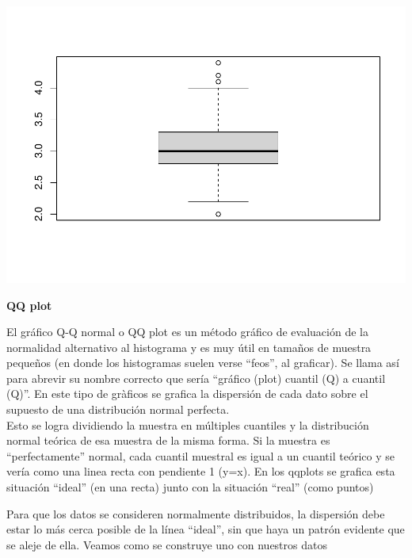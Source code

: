 \documentclass[
]{book}
\newenvironment{Shaded}{\begin{snugshade}}{\end{snugshade}}
\newcommand{\AttributeTok}[1]{\textcolor[rgb]{0.77,0.63,0.00}{#1}}
\newcommand{\CommentTok}[1]{\textcolor[rgb]{0.56,0.35,0.01}{\textit{#1}}}
\newcommand{\ConstantTok}[1]{\textcolor[rgb]{0.00,0.00,0.00}{#1}}
\newcommand{\DecValTok}[1]{\textcolor[rgb]{0.00,0.00,0.81}{#1}}
\newcommand{\FunctionTok}[1]{\textcolor[rgb]{0.00,0.00,0.00}{#1}}
\newcommand{\NormalTok}[1]{#1}
\newcommand{\SpecialCharTok}[1]{\textcolor[rgb]{0.00,0.00,0.00}{#1}}
\newcommand{\StringTok}[1]{\textcolor[rgb]{0.31,0.60,0.02}{#1}}
\begin{document}
\includegraphics{Esatadistica_en_R_files/figure-latex/unnamed-chunk-126-1.pdf}

\textbf{QQ plot}

El gráfico Q-Q normal o QQ plot es un método gráfico de evaluación de la normalidad alternativo al histograma y es muy útil en tamaños de muestra pequeños (en donde los histogramas suelen verse ``feos'', al graficar). Se llama así para abrevir su nombre correcto que sería ``gráfico (plot) cuantil (Q) a cuantil (Q)''.
En este tipo de gràficos se grafica la dispersión de cada dato sobre el supuesto de una distribución normal perfecta.\\
Esto se logra dividiendo la muestra en múltiples cuantiles y la distribución normal teórica de esa muestra de la misma forma. Si la muestra es ``perfectamente'' normal, cada cuantil muestral es igual a un cuantil teórico y se vería como una linea recta con pendiente 1 (y=x). En los qqplots se grafica esta situación ``ideal'' (en una recta) junto con la situación ``real'' (como puntos)

Para que los datos se consideren normalmente distribuidos, la dispersión debe estar lo más cerca posible de la línea ``ideal'', sin que haya un patrón evidente que se aleje de ella. Veamos como se construye uno con nuestros datos

\begin{Shaded}
\end{Shaded}
\end{document}
